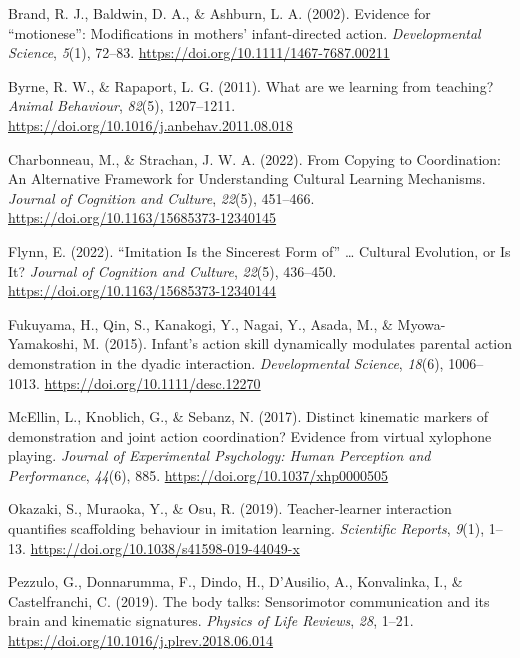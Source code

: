 \documentclass[
  man,floatsintext]{apa6}
\newlength{\cslhangindent}
\newlength{\cslentryspacingunit} %
\newenvironment{CSLReferences}[2] %
 {%
  \setlength{\parindent}{0pt}
  \ifodd #1
  \let\oldpar\par
  \def\par{\hangindent=\cslhangindent\oldpar}
  \fi
  \setlength{\parskip}{#2\cslentryspacingunit}
 }%
 {}
\begin{document}
\hypertarget{refs}{}
\begin{CSLReferences}{1}{0}
\leavevmode{}%
Brand, R. J., Baldwin, D. A., \& Ashburn, L. A. (2002). Evidence for {``motionese''}: Modifications in mothers' infant-directed action. \emph{Developmental Science}, \emph{5}(1), 72--83. \url{https://doi.org/10.1111/1467-7687.00211}

\leavevmode{}%
Byrne, R. W., \& Rapaport, L. G. (2011). What are we learning from teaching? \emph{Animal Behaviour}, \emph{82}(5), 1207--1211. \url{https://doi.org/10.1016/j.anbehav.2011.08.018}

\leavevmode{}%
Charbonneau, M., \& Strachan, J. W. A. (2022). From {Copying} to {Coordination}: {An Alternative Framework} for {Understanding Cultural Learning Mechanisms}. \emph{Journal of Cognition and Culture}, \emph{22}(5), 451--466. \url{https://doi.org/10.1163/15685373-12340145}

\leavevmode{}%
Flynn, E. (2022). {``{Imitation Is} the {Sincerest Form} of''} \ldots{} {Cultural Evolution}, or {Is It}? \emph{Journal of Cognition and Culture}, \emph{22}(5), 436--450. \url{https://doi.org/10.1163/15685373-12340144}

\leavevmode{}%
Fukuyama, H., Qin, S., Kanakogi, Y., Nagai, Y., Asada, M., \& Myowa-Yamakoshi, M. (2015). Infant's action skill dynamically modulates parental action demonstration in the dyadic interaction. \emph{Developmental Science}, \emph{18}(6), 1006--1013. \url{https://doi.org/10.1111/desc.12270}

\leavevmode{}%
McEllin, L., Knoblich, G., \& Sebanz, N. (2017). Distinct kinematic markers of demonstration and joint action coordination? {Evidence} from virtual xylophone playing. \emph{Journal of Experimental Psychology: Human Perception and Performance}, \emph{44}(6), 885. \url{https://doi.org/10.1037/xhp0000505}

\leavevmode{}%
Okazaki, S., Muraoka, Y., \& Osu, R. (2019). Teacher-learner interaction quantifies scaffolding behaviour in imitation learning. \emph{Scientific Reports}, \emph{9}(1), 1--13. \url{https://doi.org/10.1038/s41598-019-44049-x}

\leavevmode{}%
Pezzulo, G., Donnarumma, F., Dindo, H., D'Ausilio, A., Konvalinka, I., \& Castelfranchi, C. (2019). The body talks: {Sensorimotor} communication and its brain and kinematic signatures. \emph{Physics of Life Reviews}, \emph{28}, 1--21. \url{https://doi.org/10.1016/j.plrev.2018.06.014}


\end{CSLReferences}
\end{document}
